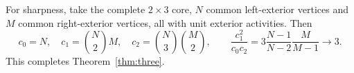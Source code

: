 For sharpness, take the complete $2\times3$ core, $N$ common left-exterior vertices and $M$ common right-exterior vertices, all with unit exterior activities. Then
\[
 c_0=N,\quad c_1=\binom N2M,\quad c_2=\binom N3\binom M2,
 \qquad
 \frac{c_1^2}{c_0c_2}=3\frac{N-1}{N-2}\frac{M}{M-1}\longrightarrow3.
\]
This completes Theorem~\ref{thm:three}.
